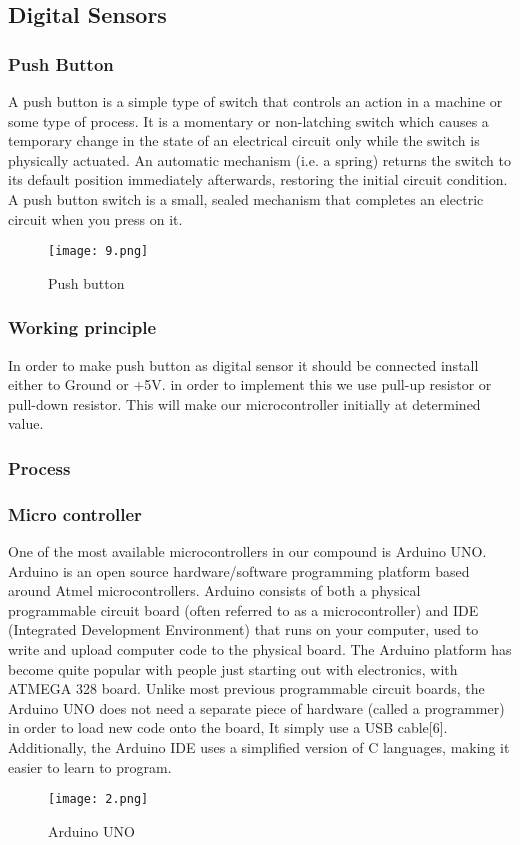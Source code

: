 \documentclass[12pt,a4paper]{article}
\begin{document}
\begin{center}
\begin{center}
\subsection*{Digital Sensors}
\subsubsection*{Push Button }
A push button is a simple type of switch that controls an action in a machine or some type of process. It is a momentary or non-latching switch which causes a temporary change in the state of an electrical circuit only while the switch is physically actuated. An automatic mechanism (i.e. a spring) returns the switch to its default position immediately afterwards, restoring the initial circuit condition. A push button switch is a small, sealed mechanism that completes an electric circuit when you press on it.
\begin{figure}[H]
	\centering 
	\texttt{[image: 9.png]}
	\caption{Push button}	
\end{figure}
\subsubsection*{Working principle }
In order to make push button as digital sensor it should be connected install either to Ground or +5V. in order to implement this we use pull-up resistor or pull-down resistor. This will make our microcontroller initially at determined value. 
\subsubsection{Process}
\subsubsection*{Micro controller}
One of the most available microcontrollers in our compound is Arduino UNO. Arduino is an open source hardware/software programming platform based around Atmel microcontrollers. Arduino consists of both a physical programmable circuit board (often referred to as a microcontroller) and IDE (Integrated Development Environment) that runs on your computer, used to write and upload computer code to the physical board. The Arduino platform has become quite popular with people just starting out with electronics, with ATMEGA 328 board. Unlike most previous programmable circuit boards, the Arduino UNO does not need a separate piece of hardware (called a programmer) in order to load new code onto the board, It simply use a USB cable[6]. Additionally, the Arduino IDE uses a simplified version of C languages, making it easier to learn to program.
\begin{figure}[H]
	\centering 
	\texttt{[image: 2.png]}
	\caption{Arduino UNO}	
\end{figure}

\end{center}
\end{center}
\end{document}
